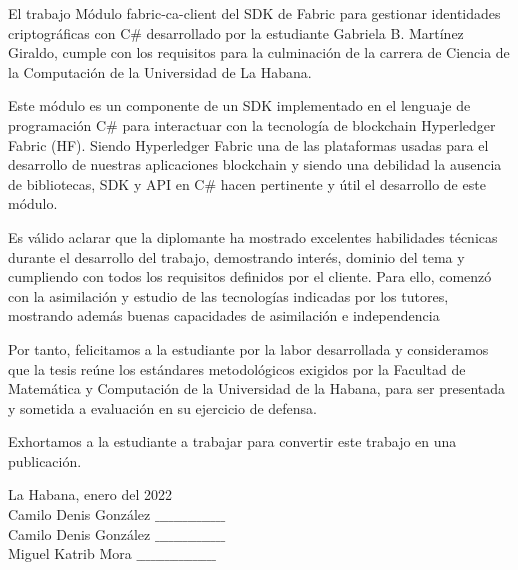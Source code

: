 \begin{opinion}
    El trabajo Módulo fabric-ca-client del SDK de Fabric para gestionar identidades criptogr\'aficas con C\# desarrollado por la estudiante Gabriela B. Martínez Giraldo, cumple con los requisitos para la culminación de la carrera de Ciencia de la Computación de la Universidad de La Habana.
   
    Este módulo es un componente de un SDK implementado en el lenguaje de programación C\# para interactuar con la tecnología de blockchain Hyperledger Fabric (HF). Siendo Hyperledger Fabric una de las plataformas usadas para el desarrollo de nuestras aplicaciones blockchain y siendo una debilidad la ausencia de bibliotecas, SDK y API en C\# hacen pertinente y útil el desarrollo de este módulo.
    
    Es válido aclarar que la diplomante ha mostrado excelentes habilidades técnicas durante el desarrollo del trabajo, demostrando interés, dominio del tema y cumpliendo con todos los requisitos definidos por el cliente. Para ello, comenzó con la asimilación y estudio de las tecnologías indicadas por los tutores, mostrando además buenas capacidades de asimilación e independencia
    
    Por tanto, felicitamos a la estudiante por la labor desarrollada y consideramos que la tesis reúne los estándares metodológicos exigidos por la Facultad de Matemática y Computación de la Universidad de la Habana, para ser presentada y sometida a evaluación en su ejercicio de defensa.
    
    Exhortamos a la estudiante a trabajar para convertir este trabajo en una publicación.
    
    La Habana, enero del 2022\\
    
    Camilo Denis González $\_\_\_\_\_\_\_\_\_\_\_\_\_\_\_$\\
    
    Camilo Denis González $\_\_\_\_\_\_\_\_\_\_\_\_\_\_\_$\\
    
    Miguel Katrib Mora $\_\_\_\_\_\_\_\_\_\_\_\_\_\_\_\_\_$\\
\end{opinion}
